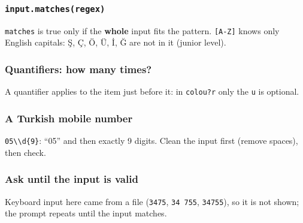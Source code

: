 \documentclass[aspectratio=169,10pt,compress]{beamer}
\begin{document}




\begin{frame}[t,fragile] \frametitle{\texttt{input.matches(regex)}}

  \vspace{0.2em}
  \small \texttt{matches} is true only if the \textbf{whole} input fits the pattern. \texttt{[A-Z]} knows only English capitals: Ş, Ç, Ö, Ü, İ, Ğ are not in it (junior level).
\end{frame}




\begin{frame}[t,fragile] \frametitle{Quantifiers: how many times?}

  \vspace{0.2em}
  \small A quantifier applies to the item just before it: in \texttt{colou?r} only the \texttt{u} is optional.
\end{frame}




\begin{frame}[t,fragile] \frametitle{A Turkish mobile number}

  \vspace{0.2em}
  \small \texttt{05\textbackslash\textbackslash d\{9\}}: ``05'' and then exactly 9 digits. Clean the input first (remove spaces), then check.
\end{frame}




\begin{frame}[t,fragile] \frametitle{Ask until the input is valid}

  \vspace{0.2em}
  \small Keyboard input here came from a file (\texttt{3475}, \texttt{34 755}, \texttt{34755}), so it is not shown; the prompt repeats until the input matches.
\end{frame}
\end{document}
